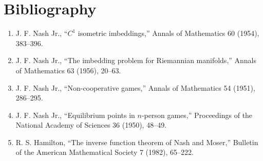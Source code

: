 \section*{Bibliography}
\begin{enumerate}
\item J. F. Nash Jr., ``$C^1$ isometric imbeddings,'' Annals of Mathematics 60 (1954), 383--396.
\item J. F. Nash Jr., ``The imbedding problem for Riemannian manifolds,'' Annals of Mathematics 63 (1956), 20--63.
\item J. F. Nash Jr., ``Non-cooperative games,'' Annals of Mathematics 54 (1951), 286--295.
\item J. F. Nash Jr., ``Equilibrium points in $n$-person games,'' Proceedings of the National Academy of Sciences 36 (1950), 48--49.
\item R. S. Hamilton, ``The inverse function theorem of Nash and Moser,'' Bulletin of the American Mathematical Society 7 (1982), 65--222.
\end{enumerate}
